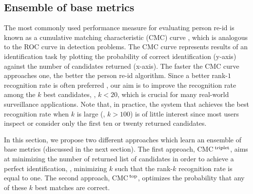 \documentclass[10pt,twocolumn,letterpaper]{article}
\def\CMCstruct{{\rm CMC$^{\,\rm top}$}\xspace}
\def\CMCtriplet{{\rm CMC$^{\,\rm triplet}$}\xspace}
\begin{document}
\subsection{Ensemble of base metrics}
\label{sec:ensemble}
The most commonly used performance measure for evaluating
person re-id is known as a cumulative
matching characteristic (CMC) curve \cite{Gray2007Evaluating},
which is analogous to the ROC curve in detection problems.
The CMC curve represents results of an identification task
by plotting the probability of correct identification (y-axis)
against the number of candidates returned (x-axis).
The faster the CMC curve approaches one, the better the person re-id algorithm.
Since a better rank-$1$ recognition rate is often preferred \cite{Zhao2014Learning},
our aim is to improve the recognition rate
among the $k$ best candidates, \eg, $k < 20$, which is crucial for many
real-world surveillance applications.
Note that, in practice, the system that achieves the best
recognition rate when $k$ is large (\eg, $k > 100$)
is of little interest since most users inspect or
consider only the first ten or twenty returned candidates.


In this section, we propose two different approaches
which learn an ensemble of base metrics (discussed in the next section).
The first approach, \CMCtriplet, aims at minimizing the number of returned list of candidates
in order to achieve a perfect identification,
\ie, minimizing $k$ such that the rank-$k$ recognition rate is equal to one.
The second approach, \CMCstruct, optimizes the probability that any of these
$k$ best matches are correct.
\end{document}
